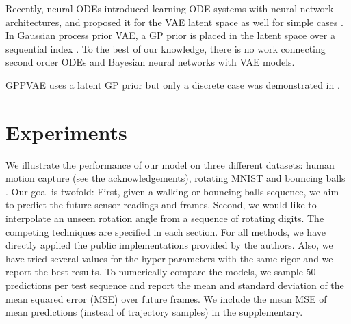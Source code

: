 \documentclass{article}
\newcommand{\0}{\mathbf{0}}
\begin{document}
Recently, neural ODEs introduced learning ODE systems with neural network architectures, and proposed it for the VAE latent space as well for simple cases \citep{chen2018neural}. In Gaussian process prior VAE, a GP prior is placed in the latent space over a sequential index \citep{casale2018gaussian}. To the best of our knowledge, there is no work connecting second order ODEs and Bayesian neural networks with VAE models.

\begin{table}[t]
    \centering
    \caption{Comparison of VAE-based models}
     GPPVAE uses a latent GP prior but only a discrete case was demonstrated in \citet{casale2018gaussian}.
    \label{tab:comparison}
\end{table}


\section{Experiments}
We illustrate the performance of our model on three different datasets: human motion capture (see the acknowledgements), rotating MNIST \citep{casale2018gaussian} and bouncing balls \citep{sutskever2009recurrent}. Our goal is twofold: First, given a walking or bouncing balls sequence, we aim to predict the future sensor readings and frames. Second, we would like to interpolate an unseen rotation angle from a sequence of rotating digits. The competing techniques are specified in each section. For all methods, we have directly applied the public implementations provided by the authors. Also, we have tried several values for the hyper-parameters with the same rigor and we report the best results. To numerically compare the models, we sample 50 predictions per test sequence and report the mean and standard deviation of the mean squared error (MSE) over future frames. We include the mean MSE of mean predictions (instead of trajectory samples) in the supplementary.
\end{document}
